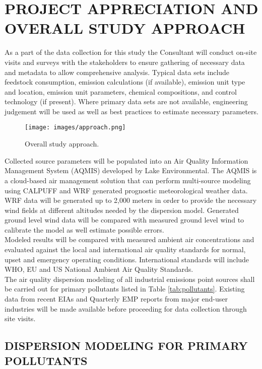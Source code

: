 \chapter{PROJECT APPRECIATION AND OVERALL STUDY APPROACH}

As a part of the data collection for this study the Consultant will conduct on-site visits and surveys with the stakeholders to ensure gathering of necessary data and metadata to allow comprehensive analysis.   Typical data sets include feedstock consumption, emission calculations (if available), emission unit type and location, emission unit parameters, chemical compositions, and control technology (if present).  Where primary data sets are not available, engineering judgement will be used as well as best practices to estimate necessary parameters.  

\begin{figure}[H]
\centering
\texttt{[image: images/approach.png]} 
\caption{Overall study approach.}
\label{fig:approach}
\end{figure}
%

Collected source parameters will be populated into an Air Quality Information Management System (AQMIS) developed by Lake Environmental. The AQMIS is a cloud-based air management solution that can perform multi-source modeling using CALPUFF and WRF generated prognostic meteorological weather data. WRF data will be generated up to 2,000 meters in order to provide the necessary wind fields at different altitudes needed by the dispersion model. Generated ground level wind data will be compared with measured ground level wind to calibrate the model as well estimate possible errors.\\

Modeled results will be compared with measured ambient air concentrations and evaluated against the local and international air quality standards for normal, upset and emergency operating conditions. International standards will include WHO, EU and US National Ambient Air Quality Standards. \\

The air quality dispersion modeling of all industrial emissions point sources shall be carried out for primary pollutants listed in Table \ref{tab:pollutants}. Existing data from recent EIAs and Quarterly EMP reports from major end-user industries will be made available before proceeding for data collection through site visits.

\section{DISPERSION MODELING FOR PRIMARY POLLUTANTS }

